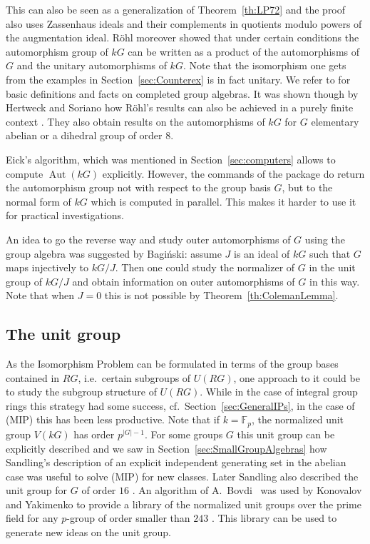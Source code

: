 \documentclass[11pt, a4paper]{amsart}
\theoremstyle{definition}
\begin{document}
This can also be seen as a generalization of Theorem~\ref{th:LP72} and the proof also uses Zassenhaus ideals and their complements in quotients modulo powers of the augmentation ideal. R\"ohl moreover showed that under certain conditions the automorphism group of $kG$ can be written as a product of the automorphisms of $G$ and the unitary automorphisms of $kG$. Note that the isomorphism one gets from the examples in Section~\ref{sec:Counterex} is in fact unitary.
We refer to \cite[Chapter 7]{WilsonBookProfinite} for basic definitions and facts on completed group algebras. It was shown though by Hertweck and Soriano how R\"ohl's results can also be achieved in a purely finite context \cite{HertweckSorianoFrattini}. They also obtain results on the automorphisms of $kG$ for $G$ elementary abelian or a dihedral group of order $8$.


Eick's algorithm, which was mentioned in Section~\ref{sec:computers} allows to compute $\operatorname{Aut}(kG)$ explicitly. However, the commands of the package \cite{ModIsom} do return the automorphism group not with respect to the group basis $G$, but to the normal form of $kG$ which is computed in parallel. This makes it harder to use it for practical investigations.

An idea to go the reverse way and study outer automorphisms of $G$ using the group algebra was suggested by Bagi\'nski: assume $J$ is an ideal of $kG$ such that $G$ maps injectively to $kG/J$. Then one could study the normalizer of $G$ in the unit group of $kG/J$ and obtain information on outer automorphisms of $G$ in this way. Note that when $J = 0$ this is not possible by Theorem~\ref{th:ColemanLemma}.

\subsection{The unit group}\label{sec:UnitGroup}

As the Isomorphism Problem can be formulated in terms of the group bases contained in $RG$, i.e.\ certain subgroups of $U(RG)$, one approach to it could be to study the subgroup structure of $U(RG)$. While in the case of integral group rings this strategy had some success, cf.\ Section~\ref{sec:GeneralIPs}, in the case of (MIP) this has been less productive. Note that if $k = \mathbb{F}_p$, the normalized unit group $V(kG)$ has order $p^{|G|-1}$. For some groups $G$ this unit group can be explicitly described and we saw in Section~\ref{sec:SmallGroupAlgebras} how Sandling's description of an explicit independent generating set in the abelian case was useful to solve (MIP) for new classes. Later Sandling also described the unit group for $G$ of order $16$ \cite{Sandling92Order16}. An algorithm of A.~Bovdi~\cite{Bovdi98} was used by Konovalov and Yakimenko to provide a library of the normalized unit groups over the prime field for any $p$-group of order smaller than $243$ \cite{UnitLib}. This library can be used to generate new ideas on the unit group.
\end{document}
